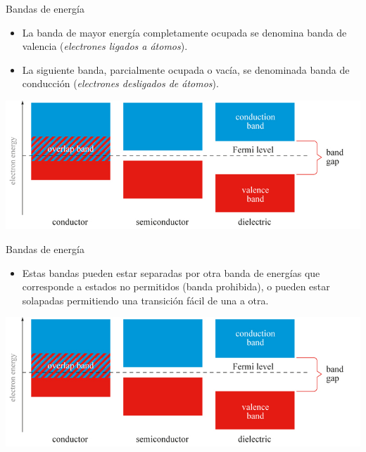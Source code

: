 \documentclass[xcolor={usenames,svgnames,dvipsnames}]{beamer}
\begin{document}
\begin{frame}[label={sec:org0aa5bae}]{Bandas de energía}
\begin{itemize}
\item La banda de mayor energía completamente ocupada se denomina \alert{banda de valencia} (\emph{electrones ligados a átomos}).

\item La siguiente banda, parcialmente ocupada o vacía, se denominada \alert{banda de conducción} (\emph{electrones desligados de átomos}).
\end{itemize}

\begin{center}


\begin{center}
\includegraphics[width=.9\linewidth]{../figs/simplified_band_diagram.jpg}
\end{center}
\end{center}
\end{frame}

\begin{frame}[label={sec:orgb9bd6b4}]{Bandas de energía}
\begin{itemize}
\item Estas bandas pueden estar separadas por otra banda de energías que corresponde a \alert{estados no permitidos} (\alert{banda prohibida}), o \alert{pueden estar solapadas} permitiendo una transición fácil de una a otra.
\end{itemize}

\begin{center}


\begin{center}
\includegraphics[width=.9\linewidth]{../figs/simplified_band_diagram.jpg}
\end{center}
\end{center}
\end{frame}
\end{document}
